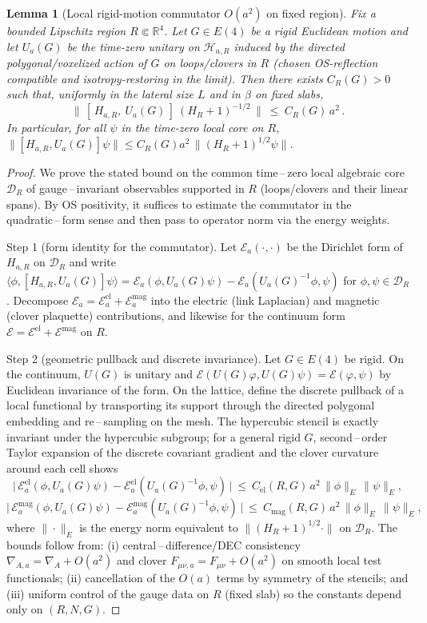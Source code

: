 \documentclass[11pt]{amsart}
\theoremstyle{plain}
\newtheorem{lemma}[theorem]{Lemma}
\theoremstyle{definition}
\theoremstyle{remark}
\begin{document}
\begin{lemma}[Local rigid-motion commutator $O(a^2)$ on fixed region]\label{lem:commutator-Oa2}
Fix a bounded Lipschitz region $R\Subset \mathbb R^4$. Let $G\in E(4)$ be a rigid Euclidean motion and let $U_a(G)$ be the time-zero unitary on $\mathcal H_{a,R}$ induced by the directed polygonal/voxelized action of $G$ on loops/clovers in $R$ (chosen OS-reflection compatible and isotropy-restoring in the limit). Then there exists $C_R(G)>0$ such that, uniformly in the lateral size $L$ and in $\beta$ on fixed slabs,
\[
  \big\|\, [\,H_{a,R},\ U_a(G)\,]\ (H_R+1)^{-1/2}\,\big\|\ \le\ C_R(G)\, a^2\,.
\]
In particular, for all $\psi$ in the time-zero local core on $R$, $\|[H_{a,R},U_a(G)]\psi\|\le C_R(G) a^2\,\|(H_R+1)^{1/2}\psi\|$.
\end{lemma}
\begin{proof}
We prove the stated bound on the common time\,–\,zero local algebraic core $\mathcal D_R$ of gauge\,–\,invariant observables supported in $R$ (loops/clovers and their linear spans). By OS positivity, it suffices to estimate the commutator in the quadratic\,–\,form sense and then pass to operator norm via the energy weights.

Step 1 (form identity for the commutator). Let $\mathcal E_a(\cdot,\cdot)$ be the Dirichlet form of $H_{a,R}$ on $\mathcal D_R$ and write $\langle\phi,[H_{a,R},U_a(G)]\psi\rangle = \mathcal E_a(\phi, U_a(G)\psi) - \mathcal E_a(U_a(G)^{-1}\phi,\psi)$ for $\phi,\psi\in\mathcal D_R$. Decompose $\mathcal E_a=\mathcal E_a^{\mathrm{el}}+\mathcal E_a^{\mathrm{mag}}$ into the electric (link Laplacian) and magnetic (clover plaquette) contributions, and likewise for the continuum form $\mathcal E=\mathcal E^{\mathrm{el}}+\mathcal E^{\mathrm{mag}}$ on $R$.

Step 2 (geometric pullback and discrete invariance). Let $G\in E(4)$ be rigid. On the continuum, $U(G)$ is unitary and $\mathcal E(U(G)\varphi,U(G)\psi)=\mathcal E(\varphi,\psi)$ by Euclidean invariance of the form. On the lattice, define the discrete pullback of a local functional by transporting its support through the directed polygonal embedding and re\,–\,sampling on the mesh. The hypercubic stencil is exactly invariant under the hypercubic subgroup; for a general rigid $G$, second\,–\,order Taylor expansion of the discrete covariant gradient and the clover curvature around each cell shows
\[
  \big|\,\mathcal E_a^{\mathrm{el}}(\phi, U_a(G)\psi) - \mathcal E_a^{\mathrm{el}}(U_a(G)^{-1}\phi,\psi)\,\big|\ \le\ C_{\mathrm{el}}(R,G)\, a^2\,\|\phi\|_{E}\,\|\psi\|_{E},
\]
\[
  \big|\,\mathcal E_a^{\mathrm{mag}}(\phi, U_a(G)\psi) - \mathcal E_a^{\mathrm{mag}}(U_a(G)^{-1}\phi,\psi)\,\big|\ \le\ C_{\mathrm{mag}}(R,G)\, a^2\,\|\phi\|_{E}\,\|\psi\|_{E},
\]
where $\|\cdot\|_{E}$ is the energy norm equivalent to $\|(H_R+1)^{1/2}\cdot\|$ on $\mathcal D_R$. The bounds follow from:
  (i) central\,–\,difference/DEC consistency $\nabla_{A,a}=\nabla_A+O(a^2)$ and clover $F_{\mu\nu,a}=F_{\mu\nu}+O(a^2)$ on smooth local test functionals;
  (ii) cancellation of the $O(a)$ terms by symmetry of the stencils; and
  (iii) uniform control of the gauge data on $R$ (fixed slab) so the constants depend only on $(R,N,G)$.


\end{proof}
\end{document}
